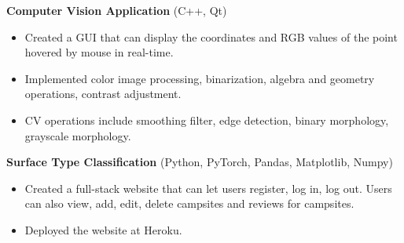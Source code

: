 \documentclass{article}
\begin{document}
\vspace{1em}

\textbf{Computer Vision Application} (C++, Qt)

\begin{itemize}[nosep]
	\item Created a GUI that can display the coordinates and RGB values of the point hovered by mouse in real-time.
	\item Implemented color image processing, binarization, algebra and geometry operations, contrast adjustment.
	\item CV operations include smoothing filter, edge detection, binary morphology,
	grayscale morphology.
\end{itemize}

\vspace{1em}

\textbf{Surface Type Classification} (Python, PyTorch, Pandas, Matplotlib, Numpy)

\begin{itemize}[nosep]
	\item Created a full-stack website that can let users register, log in, log out. Users can also view, add, edit, delete
	campsites and reviews for campsites.
	\item Deployed the website at Heroku.
\end{itemize}
\end{document}
